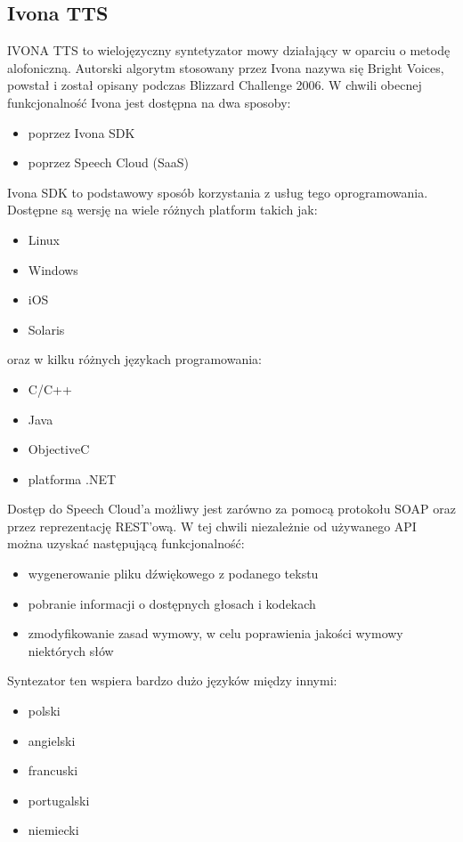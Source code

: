 \subsection{Ivona TTS}
IVONA TTS \cite{ivonasite} to wielojęzyczny syntetyzator mowy działający w oparciu o metodę alofoniczną. Autorski algorytm stosowany przez Ivona nazywa się Bright Voices,  powstał i został opisany podczas Blizzard Challenge 2006. W chwili obecnej funkcjonalność Ivona jest dostępna na dwa sposoby:
\begin{itemize}
	\item poprzez Ivona SDK
	\item poprzez Speech Cloud (SaaS)
\end{itemize}
Ivona SDK to podstawowy sposób korzystania z usług tego oprogramowania. Dostępne są wersję na wiele różnych platform takich jak:
\begin{itemize}
	\item Linux
	\item Windows
	\item iOS
	\item Solaris
\end{itemize}
oraz w kilku różnych językach programowania:
\begin{itemize}
	\item C/C++
	\item Java
	\item ObjectiveC
	\item platforma .NET
\end{itemize}
Dostęp do Speech Cloud'a możliwy jest zarówno za pomocą protokołu SOAP oraz przez reprezentację REST'ową. W tej chwili niezależnie od używanego API można uzyskać następującą funkcjonalność:
\begin{itemize}
	\item wygenerowanie pliku dźwiękowego z podanego tekstu
	\item pobranie informacji o dostępnych głosach i kodekach
	\item zmodyfikowanie zasad wymowy, w celu poprawienia jakości wymowy niektórych słów
\end{itemize}
Syntezator ten wspiera bardzo dużo języków między innymi:
 \begin{itemize}
	\item polski
	\item angielski
	\item francuski
	\item portugalski
	\item niemiecki
\end{itemize}
